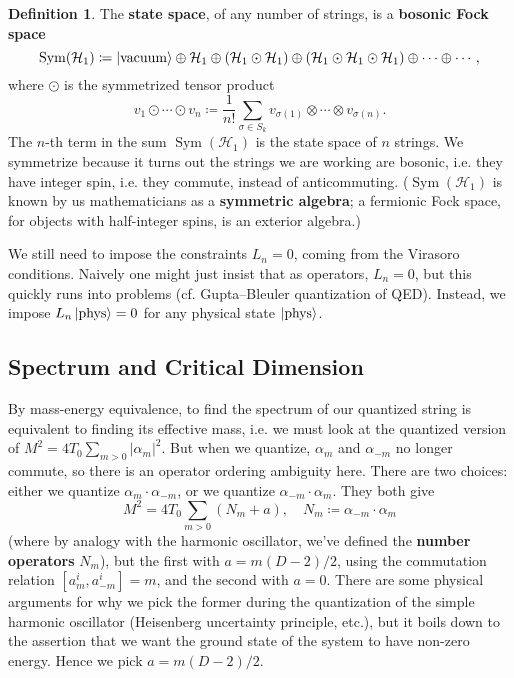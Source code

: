 \documentclass{report}
\theoremstyle{plain}
\theoremstyle{definition}
\newtheorem{definition}[theorem]{Definition}
\theoremstyle{remark}
\newcommand{\cH}{\mathcal{H}}
\DeclareMathOperator{\Sym}{Sym}
\newcommand{\vacuum}{\text{vacuum}}
\begin{document}
\begin{definition}
  The {\bf state space}, of any number of strings, is a {\bf bosonic
    Fock space}
  \[ \Sym(\cH_1) \coloneqq \ket{\vacuum} \oplus \cH_1 \oplus (\cH_1 \odot \cH_1) \oplus (\cH_1 \odot \cH_1 \odot \cH_1) \oplus \cdots \oplus \cdots, \]
  where $\odot$ is the symmetrized tensor product
  \[ v_1 \odot \cdots \odot v_n \coloneqq \frac{1}{n!} \sum_{\sigma \in S_k} v_{\sigma(1)} \otimes \cdots \otimes v_{\sigma(n)}. \]
  The $n$-th term in the sum $\Sym(\cH_1)$ is the state space of $n$
  strings. We symmetrize because it turns out the strings we are
  working are bosonic, i.e. they have integer spin, i.e. they commute,
  instead of anticommuting. ($\Sym(\cH_1)$ is known by us
  mathematicians as a {\bf symmetric algebra}; a fermionic Fock space,
  for objects with half-integer spins, is an exterior algebra.)
\end{definition}

We still need to impose the constraints $L_n = 0$, coming from the
Virasoro conditions. Naively one might just insist that as operators,
$L_n = 0$, but this quickly runs into problems (cf. Gupta--Bleuler
quantization of QED). Instead, we impose $L_n\ket{\text{phys}} = 0$
for any physical state $\ket{\text{phys}}$.

\subsection{Spectrum and Critical Dimension}

By mass-energy equivalence, to find the spectrum of our quantized
string is equivalent to finding its effective mass, i.e. we must look
at the quantized version of $M^2 = 4T_0\sum_{m > 0} |\alpha_m|^2$. But
when we quantize, $\alpha_m$ and $\alpha_{-m}$ no longer commute, so
there is an operator ordering ambiguity here. There are two choices:
either we quantize $\alpha_m \cdot \alpha_{-m}$, or we quantize
$\alpha_{-m} \cdot \alpha_m$. They both give
\[ M^2 = 4T_0 \sum_{m > 0} (N_m + a), \quad N_m \coloneqq \alpha_{-m} \cdot \alpha_m \]
(where by analogy with the harmonic oscillator, we've defined the {\bf
  number operators} $N_m$), but the first with $a = m(D-2)/2$, using
the commutation relation $[a_m^i, a_{-m}^i] = m$, and the second with
$a = 0$. There are some physical arguments for why we pick the former
during the quantization of the simple harmonic oscillator (Heisenberg
uncertainty principle, etc.), but it boils down to the assertion that
we want the ground state of the system to have non-zero energy. Hence
we pick $a = m(D-2)/2$.
\end{document}
